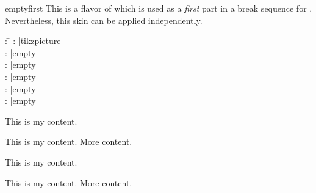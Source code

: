 \clearpage
\begin{docSkin}{emptyfirst}
This is a flavor of  which is used as a \emph{first} part
in a break sequence for .
Nevertheless, this skin can be applied independently.
\begin{tcolorbox}[skintable=emptyfirst]
  \begin{tabbing}
    : \=\kill
    :  \> |tikzpicture|\\ 
    :           \> |empty|\\
    : \> |empty|\\ 
    :        \> |empty|\\
    :    \> |empty|\\
    :           \> |empty|
  \end{tabbing}
\end{tcolorbox}
\end{docSkin}


\begin{dispExample}
\begin{tcbraster}[empty,skin=emptyfirst,raster equal height,raster columns=4,
    coltitle=Navy,borderline={2pt}{0pt}{black!10!white},
    left=1mm,right=1mm,top=1mm,bottom=1mm,middle=1mm]
  \begin{tcolorbox}
    This is my content.
  \end{tcolorbox}
  \begin{tcolorbox}
    This is my content.
    \tcblower
    More content.
  \end{tcolorbox}
  \begin{tcolorbox}[adjusted title=My title]
    This is my content.
  \end{tcolorbox}
  \begin{tcolorbox}[adjusted title=My title]
    This is my content.
    \tcblower
    More content.
  \end{tcolorbox}
\end{tcbraster}
\end{dispExample}


\clearpage

